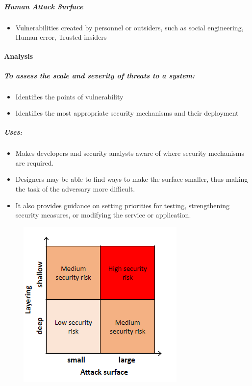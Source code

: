 \documentclass{article}
\begin{document}
                    \subparagraph{Human Attack Surface}
                    \begin{itemize}
                        \item Vulnerabilities created by personnel or outsiders, such as social engineering, Human error, Trusted insiders
                    \end{itemize}
                \newpage
                \paragraph{Analysis}
                    \subparagraph{To assess the scale and severity of threats to a system:}
                    \begin{itemize}
                        \item Identifies the points of vulnerability
                        \item Identifies the most appropriate security mechanisms and their deployment
                      \end{itemize}
                    \subparagraph{Uses:}
                        \begin{itemize}
                            \item Makes developers and security analysts aware of where security mechanisms are required.
                            \item Designers may be able to find ways to make the surface smaller, thus making the task of the adversary more difficult.
                            \item It also provides guidance on setting priorities for testing, strengthening security measures, or modifying the service or application.
                        \end{itemize}
                    
                    \begin{figure}[h]
                        \begin{center}
                        \includegraphics{../immagini/Defense_in_depth.png}
                        \end{center}
                    \end{figure}
\end{document}
